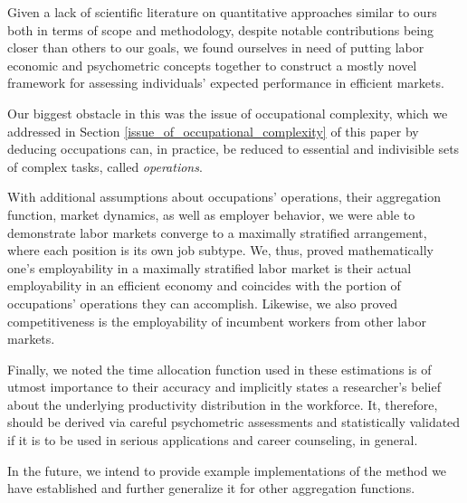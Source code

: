 \documentclass[hidelinks, nonatbib]{elsarticle}
\begin{document}
Given a lack of scientific literature on quantitative approaches similar to ours both in terms of scope and methodology, despite notable contributions being closer than others to our goals, we found ourselves in need of putting labor economic and psychometric concepts together to construct a mostly novel framework for assessing individuals' expected performance in efficient markets.

Our biggest obstacle in this was the issue of occupational complexity, which we addressed in Section \ref{issue_of_occupational_complexity} of this paper by deducing occupations can, in practice, be reduced to essential and indivisible sets of complex tasks, called \textit{operations}.

With additional assumptions about occupations' operations, their aggregation function, market dynamics, as well as employer behavior, we were able to demonstrate labor markets converge to a maximally stratified arrangement, where each position is its own job subtype. We, thus, proved mathematically one's employability in a maximally stratified labor market is their actual employability in an efficient economy and coincides with the portion of occupations' operations they can accomplish. Likewise, we also proved competitiveness is the employability of incumbent workers from other labor markets.

Finally, we noted the time allocation function used in these estimations is of utmost importance to their accuracy and implicitly states a researcher's belief about the underlying productivity distribution in the workforce. It, therefore, should be derived via careful psychometric assessments and statistically validated if it is to be used in serious applications and career counseling, in general.

In the future, we intend to provide example implementations of the method we have established and further generalize it for other aggregation functions.

\newpage
\printbibliography[
    heading=bibintoc,
    title={References}
]





\end{document}
